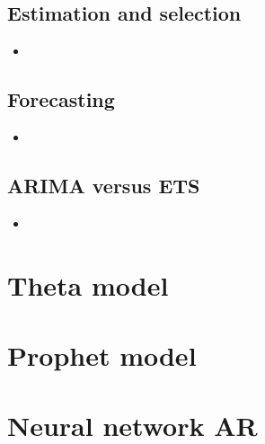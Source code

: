 \documentclass{article}
\begin{document}
\subsection{Estimation and selection}

\begin{itemize}
\item 
\end{itemize}

\subsection{Forecasting}

\begin{itemize}
\item 
\end{itemize}

\subsection{ARIMA versus ETS}
\begin{itemize}
\item 
\end{itemize}

\section{Theta model}

\section{Prophet model}

\section{Neural network AR}
\end{document}
